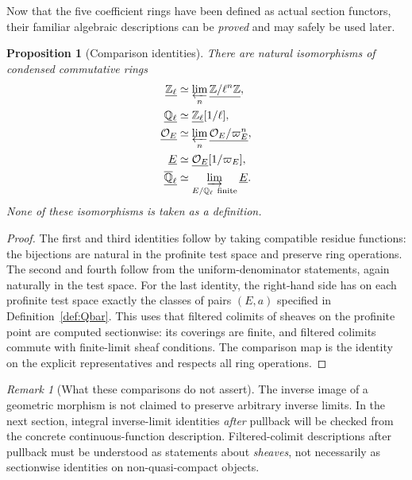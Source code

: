\documentclass[11pt,a4paper]{article}
\numberwithin{equation}{section}
\newtheorem{proposition}[theorem]{Proposition}
\theoremstyle{definition}
\theoremstyle{remark}
\newtheorem{remark}[theorem]{Remark}
\newcommand{\OO}{\mathcal O}
\newcommand{\ringunder}[1]{\underline{#1}}
\newcommand{\Qlbar}{\overline{\mathbb Q}_{\ell}}
\begin{document}
Now that the five coefficient rings have been defined as actual
section functors, their familiar algebraic descriptions can be
\emph{proved} and may safely be used later.

\begin{proposition}[Comparison identities]\label{prop:comparison-only}
There are natural isomorphisms of condensed commutative rings
\begin{align}
 \ringunder{\mathbb Z_\ell}
   &\simeq\varprojlim_n\ringunder{\mathbb Z/\ell^n\mathbb Z},
      \label{eq:Zl-comparison}\\
 \ringunder{\mathbb Q_\ell}
   &\simeq\ringunder{\mathbb Z_\ell}[1/\ell],
      \label{eq:Ql-comparison}\\
 \ringunder{\OO_E}
   &\simeq\varprojlim_n\ringunder{\OO_E/\varpi_E^n},
      \label{eq:OE-comparison}\\
 \ringunder E
   &\simeq\ringunder{\OO_E}[1/\varpi_E],
      \label{eq:E-comparison}\\
 \ringunder{\Qlbar}
   &\simeq\varinjlim_{E/\mathbb Q_\ell\ \mathrm{finite}}\ringunder E.
      \label{eq:Qbar-comparison}
\end{align}
\emph{None} of these isomorphisms is taken as a definition.
\end{proposition}
\begin{proof}
The first and third identities follow by taking compatible residue
functions: the bijections are natural in the profinite test space and
preserve ring operations.  The second and fourth follow from the
uniform-denominator statements, again naturally in the test space.
For the last identity, the right-hand side has on each profinite test
space exactly the classes of pairs $(E,a)$ specified in
Definition~\ref{def:Qbar}.  This uses that filtered colimits of
sheaves on the profinite point are computed sectionwise: its coverings
are finite, and filtered colimits commute with finite-limit sheaf
conditions.  The comparison map is the identity on the explicit
representatives and respects all ring operations.
\end{proof}

\begin{remark}[What these comparisons do not assert]
The inverse image of a geometric morphism is not claimed to preserve
arbitrary inverse limits.  In the next section, integral inverse-limit
identities \emph{after} pullback will be checked from the concrete
continuous-function description.  Filtered-colimit descriptions after
pullback must be understood as statements about \emph{sheaves}, not
necessarily as sectionwise identities on non-quasi-compact objects.
\end{remark}
\end{document}
